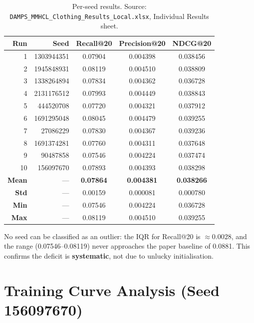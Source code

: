 \documentclass[12pt,a4paper]{article}
\begin{document}
\begin{table}[htbp]
\centering
\caption{Per-seed results. Source: \texttt{DAMPS\_MMHCL\_Clothing\_Results\_Local.xlsx}, Individual Results sheet.}
\label{tab:per_seed}
\begin{tabular}{|r|r|c|c|c|}
\hline
\rowcolor{tabhead}\textbf{Run} & \textbf{Seed} & \textbf{Recall@20} & \textbf{Precision@20} & \textbf{NDCG@20} \\
\hline
1  & 1303944351 & 0.07904 & 0.004398 & 0.038456 \\\hline
2  & 1945848931 & 0.08119 & 0.004510 & 0.038809 \\\hline
3  & 1338264894 & 0.07834 & 0.004362 & 0.036728 \\\hline
4  & 2131176512 & 0.07993 & 0.004449 & 0.038843 \\\hline
5  & 444520708  & 0.07720 & 0.004321 & 0.037912 \\\hline
6  & 1691295048 & 0.08045 & 0.004479 & 0.039255 \\\hline
7  & 27086229   & 0.07830 & 0.004367 & 0.039236 \\\hline
8  & 1691374281 & 0.07760 & 0.004311 & 0.037648 \\\hline
9  & 90487858   & 0.07546 & 0.004224 & 0.037474 \\\hline
10 & 156097670  & 0.07893 & 0.004393 & 0.038298 \\\hline
\textbf{Mean} & --- & \textbf{0.07864} & \textbf{0.004381} & \textbf{0.038266} \\\hline
\textbf{Std}  & --- & 0.00159 & 0.000081 & 0.000780 \\\hline
\textbf{Min}  & --- & 0.07546 & 0.004224 & 0.036728 \\\hline
\textbf{Max}  & --- & 0.08119 & 0.004510 & 0.039255 \\\hline
\end{tabular}
\end{table}

No seed can be classified as an outlier: the IQR for Recall@20 is
$\approx 0.0028$, and the range (0.07546--0.08119) never approaches the
paper baseline of 0.0881.  This confirms the deficit is \textbf{systematic},
not due to unlucky initialisation.

\section{Training Curve Analysis (Seed 156097670)}
\end{document}
